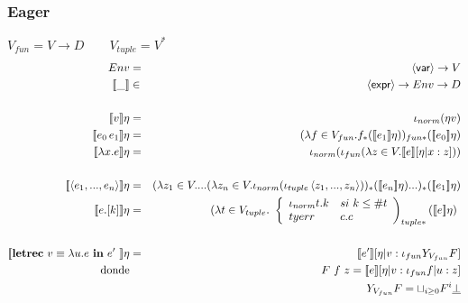     \subsubsection{Eager}
      \PN $V_{fun} = V \rightarrow D \qquad V_{tuple} = V^{*}$
      \begin{eqnarray*}
        Env &=& \var \to V \\
        \llbracket\_\rrbracket &\in& \expr \to Env \to D \\ \\
        \llbracket v\rrbracket\eta &=& \iota_{norm}(\eta v) \\
        \llbracket e_0\, e_1\rrbracket\eta &=& (\lambda f \in V_{fun}. f_{*} (\se{e_1}\eta))_{fun*} (\se{e_0}\eta) \\
        \llbracket\lambda x.e\rrbracket\eta &=& \iota_{norm}(\iota_{fun}(\lambda z \in V. \se{e}[\eta|x:z])) \\ \\
        \se{\la e_1, ..., e_n \ra}\eta &=& (\lambda z_1 \in V. ... (\lambda z_n \in V . \iota_{norm}(\iota_{tuple} \la z_1, ..., z_n\ra))_{*} (\se{e_n}\eta) ...)_{*} (\se{e_1}\eta) \\
        \se{e.[k]}\eta &=& (\lambda t \in V_{tuple}. \ \left\lbrace 
        \begin{array}{lll}
          \iota_{norm} t.k & si \ k \leq \# t \\
          tyerr & c.c \\
        \end{array}\right)_{tuple*} (\se{e}\eta) \\ \\
        \se{\letrecin{v \equiv \lambda u.e}{e'}}\eta &=& \se{e'} [\eta |v:\iota_{fun} Y_{V_{fun}} F] \\
        \text{donde} && F\ f\ z = \se{e}[\eta| v: \iota_{fun} f | u:z] \\
        && Y_{V_{fun}} F = \sqcup_{i \geq 0} F^{i} \underline{\bot}
      \end{eqnarray*}